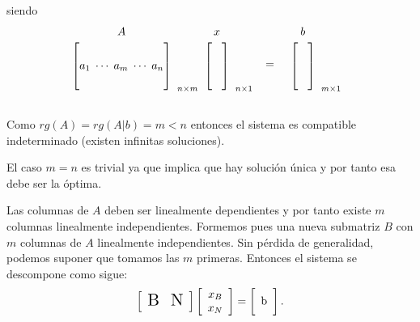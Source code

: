 siendo 
$$
\begin{blockarray}{cc}
  A & \\
  \begin{block}{[c]l}
    \multirow{4}{*}{$a_1\;\cdots\; a_m\;\cdots\; a_n$} & \\
    & \\
    & \\
    & _{n\times m}\\
  \end{block}
\end{blockarray}
\begin{blockarray}{cc}
  x & \\
  \begin{block}{[c]l}
    \hspace*{0.3cm}& \\
    & \\
    & \\
    & _{n\times 1}\\
  \end{block}
\end{blockarray}
\begin{array}{c}
  = \\
\end{array}\quad
\begin{blockarray}{cc}
  b & \\
  \begin{block}{[c]l}
    \hspace*{0.3cm}& \\
    & \\
    & \\
    & _{m\times 1}\\
  \end{block}
\end{blockarray}
$$

Como $rg(A)=rg(A|b)=m<n$ entonces el sistema es compatible indeterminado (existen infinitas soluciones).

\begin{nota}
  El caso $m=n$ es trivial ya que implica que hay solución única y por tanto esa debe ser la óptima.
\end{nota} 

Las columnas de $A$ deben ser linealmente dependientes y por tanto existe $m$ columnas linealmente independientes. Formemos pues una nueva submatriz $B$ con $m$ columnas de $A$ linealmente independientes. Sin pérdida de generalidad, podemos suponer que tomamos las $m$ primeras. Entonces el sistema se descompone como sigue:
\begin{equation}
  \left[
    \begin{array}{cc}
      \scalebox{1.5}{B} & \scalebox{1.5}{N}
    \end{array}
  \right]
  \left[
    \begin{array}{c}
      x_B \\ x_N
    \end{array}\right]=
  \left[
    \begin{array}{c}
      \multirow{2}{*}{b} \\
      \\
    \end{array}\right].\label{desc2.1}
\end{equation}

